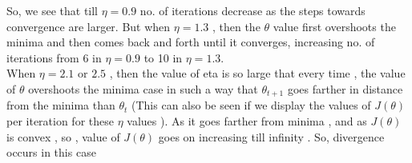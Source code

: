 \documentclass{article}
\begin{document}
\begin{enumerate}[label=(\alph*)]
         So, we see that till $\eta =0.9$ no. of iterations decrease as the steps towards convergence are larger. But when $\eta = 1.3$ , then the $\theta$ value first overshoots the minima and then comes back and forth until it converges, increasing no. of iterations from 6 in $\eta = 0.9$ to 10 in $\eta = 1.3$.\\
         
         When $\eta = 2.1$ or $2.5$ , then the value of eta is so large that every time , the value of $\theta$ overshoots the minima case in such a way that $\theta _{t+1}$ goes farther in distance from the minima than $\theta _t$ (This can also be seen if we display the values of $J(\theta)$ per iteration for these $\eta$ values ). As it goes farther from minima , and  as $J(\theta)$ is convex , so ,  value of $J(\theta)$  goes on increasing till infinity . So, divergence occurs in this case
         
\end{enumerate}
    
    
    
\end{document}
